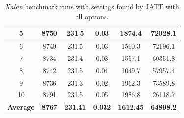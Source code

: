 \documentclass[
  digital, %
  oneside,
  notable, %
  nolof,     %
  nolot     %
]{fithesis3}
\begin{document}
\begin{table}[]
\begin{tabular}{|c|c|c|c|c|c|}
		5                & 8750                                                         & 231.5                                                                 & 0.03                                                                  & 1874.4                                                               & 72028.1                                                         \\ \hline
		6                & 8740                                                         & 231.5                                                                 & 0.03                                                                  & 1590.3                                                               & 72196.1                                                         \\ \hline
		7                & 8734                                                         & 231.4                                                                 & 0.03                                                                  & 1557.1                                                               & 60351.8                                                         \\ \hline
		8                & 8742                                                         & 231.5                                                                 & 0.04                                                                  & 1049.7                                                               & 57957.4                                                         \\ \hline
		9                & 8736                                                         & 231.3                                                                 & 0.02                                                                  & 1962.3                                                               & 73589.8                                                         \\ \hline
		10               & 8791                                                         & 231.5                                                                 & 0.05                                                                  & 1986.8                                                               & 26118.7                                                         \\ \hline
		\textbf{Average} & \textbf{8767}                                                & \textbf{231.41}                                                       & \textbf{0.032}                                                        & \textbf{1612.45}                                                     & \textbf{64898.2}                                                \\ \hline
	\end{tabular}
	\caption{\textit{Xalan} benchmark runs with settings found by JATT with all options.}
	\label{jattalloptionsresults}
\end{table}
\end{document}
